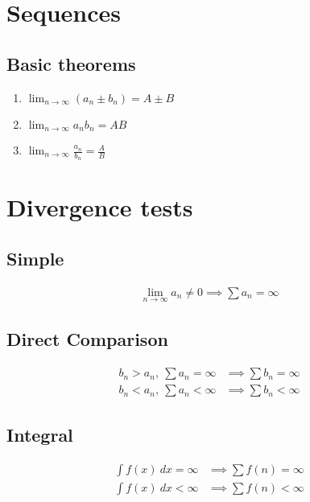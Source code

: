 \documentclass[12pt]{article}
\begin{document}
\begin{multicols}{2}

\section*{Sequences}

\subsection*{Basic theorems}
\begin{enumerate}
    \item $\lim_{n\to\infty} (a_n \pm b_n) = A \pm B$
    \item $\lim_{n\to\infty} a_n b_n = AB$
    \item $\lim_{n\to\infty} \frac{a_n}{b_n} = \frac{A}{B}$
\end{enumerate}



\section*{Divergence tests}

\subsection*{Simple}
\begin{align*}
    \lim_{n\to\infty} a_n \neq 0 \implies \sum a_n = \infty
\end{align*}

\subsection*{Direct Comparison}
\begin{align*}
    b_n > a_n,\ \sum a_n = \infty &\implies \sum b_n = \infty \\
    b_n < a_n,\ \sum a_n < \infty &\implies \sum b_n < \infty
\end{align*}

\subsection*{Integral}
\begin{align*}
    \int f(x)\ dx = \infty &\implies \sum f(n) = \infty \\
    \int f(x)\ dx < \infty &\implies \sum f(n) < \infty
\end{align*}


\end{multicols}
\end{document}
